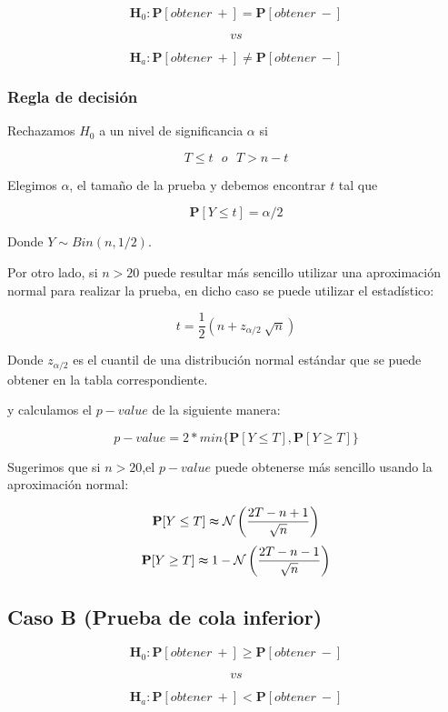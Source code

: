 \documentclass[
  a4paper,
  oneside,
  openany]{book}
\begin{document}
\[\textbf{H}_0: \mathbf{P}[obtener\ +]= \mathbf{P}[obtener\ -]\]

\[vs\]

\[\textbf{H}_a: \mathbf{P}[obtener\ +] \neq \mathbf{P}[obtener\ -]\]

\hypertarget{regla-de-decisiuxf3n-10}{%
\subsubsection*{Regla de decisión}\label{regla-de-decisiuxf3n-10}}


Rechazamos \(H_0\) a un nivel de significancia \(\alpha\) si

\[T \leq t \ \ \  o \ \ \ T>n-t\]

Elegimos \(\alpha\), el tamaño de la prueba y debemos encontrar \(t\) tal que

\[\mathbf{P}[Y \leq t]=\alpha/2\]

Donde \(Y \sim Bin (n,1/2)\).

Por otro lado, si \(n>20\) puede resultar más sencillo utilizar una aproximación normal para realizar la prueba, en dicho caso se puede utilizar el estadístico:

\[t=\frac{1}{2}\left(n+z_{\alpha/2}\ \sqrt{n}\right)\]

Donde \(z_{\alpha/2}\) es el cuantil de una distribución normal estándar que se puede obtener en la tabla correspondiente.

y calculamos el \(p-value\) de la siguiente manera:

\[p-value=2*min\{\mathbf{P}[Y\leq T],\mathbf{P}[Y\geq T]\}\]

Sugerimos que si \(n>20\),el \(p-value\) puede obtenerse más sencillo usando la aproximación normal:

\[\mathbf{P}[Y\leq T] \thickapprox  \mathcal{N} \left(\frac{2T-n+1}{\sqrt{n}}\right)\]
\[\mathbf{P}[Y\geq T] \thickapprox 1- \mathcal{N} \left(\frac{2T-n-1}{\sqrt{n}}\right)\]

\hypertarget{caso-b-prueba-de-cola-inferior-3}{%
\subsection*{Caso B (Prueba de cola inferior)}\label{caso-b-prueba-de-cola-inferior-3}}


\[\textbf{H}_0: \mathbf{P}[obtener\ +] \geq \mathbf{P}[obtener\ -]\]

\[vs\]

\[\textbf{H}_a: \mathbf{P}[obtener\ +] < \mathbf{P}[obtener\ -]\]
\end{document}
